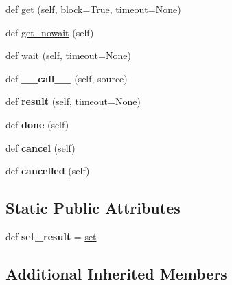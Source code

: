 \begin{DoxyCompactItemize}
\item 
def \hyperlink{classgevent_1_1event_1_1_async_result_a0bce88da8039374f01304f65b7a43a34}{get} (self, block=True, timeout=None)
\item 
def \hyperlink{classgevent_1_1event_1_1_async_result_a8cc986866f45ba3ff3ad3658bf7280bf}{get\+\_\+nowait} (self)
\item 
def \hyperlink{classgevent_1_1event_1_1_async_result_adce89ba3e726e21dd67a10047b8e70c1}{wait} (self, timeout=None)
\item 
\mbox{\label{classgevent_1_1event_1_1_async_result_a9aa89782f21095e140fcc2e7177c616b}} 
def {\bfseries \+\_\+\+\_\+call\+\_\+\+\_\+} (self, source)
\item 
\mbox{\label{classgevent_1_1event_1_1_async_result_a67aac9d9a02ec6a6636463cc0d3ee482}} 
def {\bfseries result} (self, timeout=None)
\item 
\mbox{\label{classgevent_1_1event_1_1_async_result_a860a60394145922b27bafbd28bf6df33}} 
def {\bfseries done} (self)
\item 
\mbox{\label{classgevent_1_1event_1_1_async_result_aa798795c474a9f4f7fa68bfb8cf1ac64}} 
def {\bfseries cancel} (self)
\item 
\mbox{\label{classgevent_1_1event_1_1_async_result_aa96aa2a523c274e38c64290c288a6c80}} 
def {\bfseries cancelled} (self)
\end{DoxyCompactItemize}
\subsection*{Static Public Attributes}
\begin{DoxyCompactItemize}
\item 
\mbox{\label{classgevent_1_1event_1_1_async_result_ae7d8ad9c051db7ae4331c31bbcea6ba9}} 
def {\bfseries set\+\_\+result} = \hyperlink{classgevent_1_1event_1_1_async_result_a4dc750ec7ee0f71beebe3861c7c9d9af}{set}
\end{DoxyCompactItemize}
\subsection*{Additional Inherited Members}


